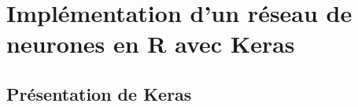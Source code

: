 \chapter{Implémentation d'un réseau de neurones en R avec Keras}
\label{chap:Keras}

\section{Présentation de Keras}
\label{sec:keras:presentation}


